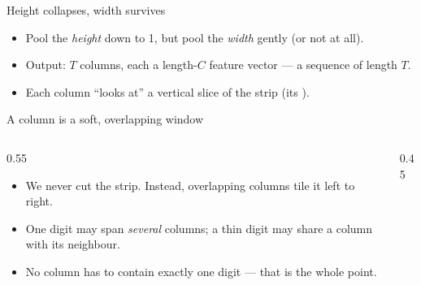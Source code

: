\documentclass[10pt,aspectratio=169]{beamer}
\begin{document}
\begin{frame}{Height collapses, width survives}
  \begin{center}
  \end{center}
  \begin{itemize}
    \item Pool the \emph{height} down to 1, but pool the \emph{width} gently (or not at all).
    \item Output: $T$ columns, each a length-$C$ feature vector --- a sequence of length $T$.
    \item Each column ``looks at'' a vertical slice of the strip (its ).
  \end{itemize}
\end{frame}

\begin{frame}{A column is a soft, overlapping window}
  \begin{columns}[T]
    \begin{column}{0.55\textwidth}
      \begin{itemize}
        \item We never cut the strip. Instead, overlapping columns tile it left to right.
        \item One digit may span \emph{several} columns; a thin digit may share a column with its neighbour.
        \item No column has to contain exactly one digit --- that is the whole point.
      \end{itemize}
    \end{column}
    \begin{column}{0.45\textwidth}
      \begin{center}
      \end{center}
    \end{column}
  \end{columns}
\end{frame}
\end{document}
